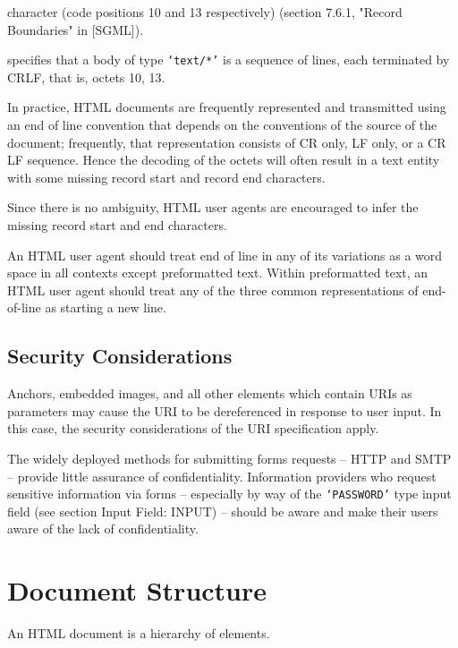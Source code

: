 character (code positions 10 and 13 respectively) (section
7.6.1, "Record Boundaries" in [SGML]).
\par \par 
[MIME] specifies that a body of type {\tt `text/*'} is a sequence of
lines, each terminated by CRLF, that is, octets 10, 13.
\par \par 
In practice, HTML documents are frequently represented and
transmitted using an end of line convention that depends on the
conventions of the source of the document;  frequently, that
representation consists of CR only, LF only, or a CR LF
sequence.  Hence the decoding of the octets will often result in
a text entity with some missing record start and record end
characters.
\par \par 
Since there is no ambiguity, HTML user agents are encouraged to
infer the missing record start and end characters.
\par \par 
An HTML user agent should treat end of line in any of its
variations as a word space in all contexts except
preformatted text.  Within preformatted text, an HTML user agent
should treat any of the three common representations of
end-of-line as starting a new line.
\par \subsection*{Security Considerations}\par 
Anchors, embedded images, and all other elements which contain
URIs as parameters may cause the URI to be dereferenced in response
to user input.  In this case, the security considerations of the URI
specification apply.
\par \par 
The widely deployed methods for submitting forms requests -- HTTP and
SMTP -- provide little assurance of confidentiality.  Information
providers who request sensitive information via forms -- especially by
way of the {\tt `PASSWORD'} type input field (see section Input Field:  INPUT)
-- should be aware and make their users aware of the lack of
confidentiality.
\par \section*{Document Structure}\par 
An HTML document is a hierarchy of elements.
